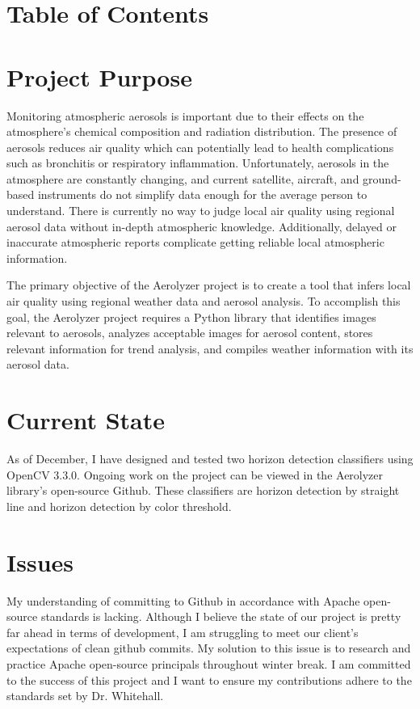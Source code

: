 \documentclass[onecolumn, draftclsnofoot,10pt, compsoc]{IEEEtran}
\begin{document}
\section{Table of Contents}
\tableofcontents


\clearpage

\begin{singlespace}

	\section{Project Purpose}
		Monitoring atmospheric aerosols is important due to their effects on the atmosphere's chemical composition and radiation distribution.
		The presence of aerosols reduces air quality which can potentially lead to health complications such as bronchitis or respiratory inflammation.
		Unfortunately, aerosols in the atmosphere are constantly changing, and current satellite, aircraft, and ground-based instruments do not simplify data enough for the average person to understand.
		There is currently no way to judge local air quality using regional aerosol data without in-depth atmospheric knowledge.
		Additionally, delayed or inaccurate atmospheric reports complicate getting reliable local atmospheric information.


		The primary objective of the Aerolyzer project is to create a tool that infers local air quality using regional weather data and aerosol analysis.
		To accomplish this goal, the Aerolyzer project requires a Python library that identifies images relevant to aerosols, analyzes acceptable images for aerosol content, stores relevant information for trend analysis, and compiles weather information with its aerosol data.
		
	\section{Current State}
		As of December, I have designed and tested two horizon detection classifiers using OpenCV 3.3.0.
		Ongoing work on the project can be viewed in the Aerolyzer library’s open-source Github.
		These classifiers are horizon detection by straight line and horizon detection by color threshold.

	\section{Issues}
		My understanding of committing to Github in accordance with Apache open-source standards is lacking.
		Although I believe the state of our project is pretty far ahead in terms of development, I am struggling to meet our client's expectations of clean github commits.
		My solution to this issue is to research and practice Apache open-source principals throughout winter break.
		I am committed to the success of this project and I want to ensure my contributions adhere to the standards set by Dr. Whitehall.


\end{singlespace}
\end{document}
